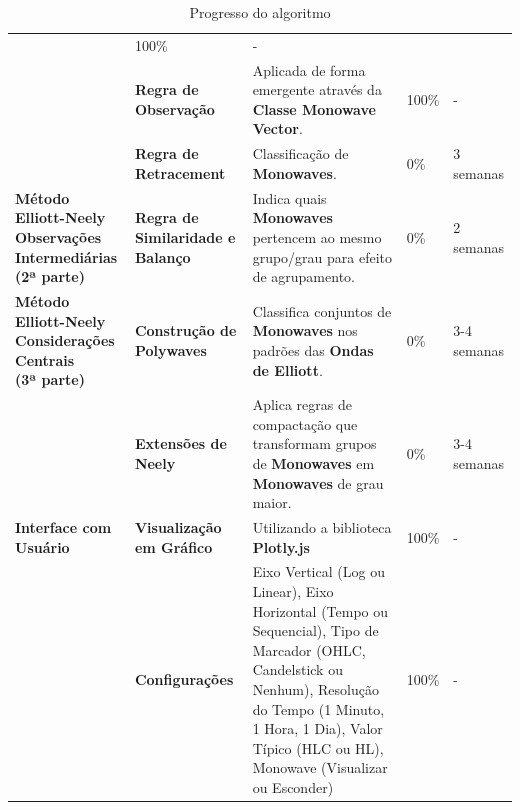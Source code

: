 \documentclass[12pt]{article}
\begin{document}
\begin{table}[H]
\begin{tabular}{|L{3cm}|L{2cm}|L{5cm}|R{1.4cm}|R{1.4cm}|}
		& 100\%
		& - \\
		& \textbf{Regra de Observação}
		& Aplicada de forma emergente através da \textbf{Classe Monowave Vector}.
		& 100\%
		& - \\
		& \textbf{Regra de Retracement}
		& Classificação de \textbf{Monowaves}.
		& 0\%
		& 3 semanas \\
	\hline
	\textbf{Método Elliott-Neely \newline Observações Intermediárias \newline (2ª parte)}
		& \textbf{Regra de Similaridade e Balanço}
		& Indica quais \textbf{Monowaves} pertencem ao mesmo grupo/grau para efeito de agrupamento.
		& 0\%
		& 2 semanas \\
	\hline
	\textbf{Método Elliott-Neely \newline Considerações Centrais \newline (3ª parte)}
		& \textbf{Construção de Polywaves}
		& Classifica conjuntos de \textbf{Monowaves} nos padrões das \textbf{Ondas de Elliott}.
		& 0\%
		& 3-4 semanas \\
		& \textbf{Extensões de Neely}
		& Aplica regras de compactação que transformam grupos de \textbf{Monowaves} em \textbf{Monowaves} de grau maior.
		& 0\%
		& 3-4 semanas \\
	\hline
	\textbf{Interface com Usuário}
		& \textbf{Visualização em Gráfico}
		& Utilizando a biblioteca \textbf{Plotly.js}
		& 100\%
		& - \\
		& \textbf{Configurações}
		& Eixo Vertical (Log ou Linear), Eixo Horizontal (Tempo ou Sequencial), Tipo de Marcador (OHLC, Candelstick ou Nenhum), Resolução do Tempo (1 Minuto, 1 Hora, 1 Dia), Valor Típico (HLC ou HL), Monowave (Visualizar ou Esconder)
		& 100\%
		& - \\
	\hline
\end{tabular} 
\caption{Progresso do algoritmo}
\label{tab:progresso}
\end{table}
\endgroup

\newpage



\end{document}
